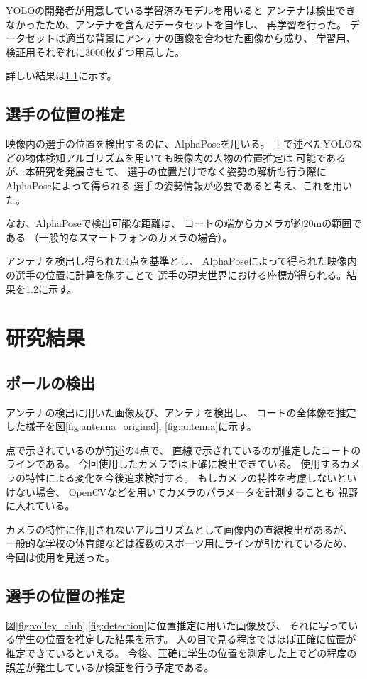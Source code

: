 \documentclass[twoside,twocolumn]{jsarticle}
\begin{document}
		YOLOの開発者が用意している学習済みモデルを用いると
		アンテナは検出できなかったため、アンテナを含んだデータセットを自作し、
		再学習を行った。
		データセットは適当な背景にアンテナの画像を合わせた画像から成り、
		学習用、検証用それぞれに3000枚ずつ用意した。
		
		詳しい結果は\ref{sec:pole_result}に示す。

	\subsection{選手の位置の推定} \label{sec:pos_theory}
		映像内の選手の位置を検出するのに、AlphaPose\cite{Fang}を用いる。
		上で述べたYOLOなどの物体検知アルゴリズムを用いても映像内の人物の位置推定は
		可能であるが、本研究を発展させて、
		選手の位置だけでなく姿勢の解析も行う際にAlphaPoseによって得られる
		選手の姿勢情報が必要であると考え、これを用いた。

		なお、AlphaPoseで検出可能な距離は、
		コートの端からカメラが約20mの範囲である
		（一般的なスマートフォンのカメラの場合）。 

		アンテナを検出し得られた4点を基準とし、
		AlphaPoseによって得られた映像内の選手の位置に計算を施すことで
		選手の現実世界における座標が得られる。結果を\ref{sec:pos_result}に示す。

\section{研究結果}
	\subsection{ポールの検出} \label{sec:pole_result}
		アンテナの検出に用いた画像及び、アンテナを検出し、
		コートの全体像を推定した様子を図\ref{fig:antenna_original},
		\ref{fig:antenna}に示す。


		点で示されているのが前述の4点で、
		直線で示されているのが推定したコートのラインである。
		今回使用したカメラでは正確に検出できている。
		使用するカメラの特性による変化を今後追求検討する。
		もしカメラの特性を考慮しないといけない場合、
		OpenCV\cite{Bradski}などを用いてカメラのパラメータを計測することも
		視野に入れている。

		カメラの特性に作用されないアルゴリズムとして画像内の直線検出があるが、
		一般的な学校の体育館などは複数のスポーツ用にラインが引かれているため、
		今回は使用を見送った。

	\subsection{選手の位置の推定} \label{sec:pos_result}
		図\ref{fig:volley_club},\ref{fig:detection}に位置推定に用いた画像及び、
		それに写っている学生の位置を推定した結果を示す。
		人の目で見る程度ではほぼ正確に位置が推定できているといえる。
		今後、正確に学生の位置を測定した上でどの程度の誤差が発生しているか検証を行う予定である。
\end{document}
